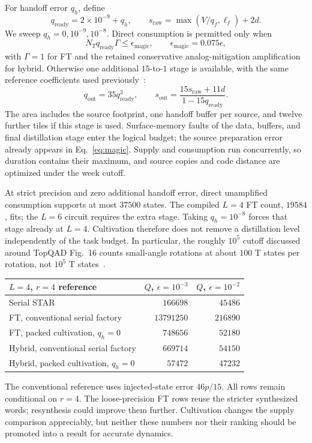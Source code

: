 \documentclass[11pt]{article}
\newcommand{\eps}{\epsilon}
\begin{document}
For handoff error $q_h$, define
\begin{equation}
 q_{\mathrm{ready}}=2\times10^{-9}+q_h,\qquad
 s_{\mathrm{raw}}=\max(V/q_f,\ell_f)+2d.
\end{equation}
We sweep $q_h=0,10^{-9},10^{-8}$. Direct consumption is permitted only when
\begin{equation}\label{eq:magic}
 N_T q_{\mathrm{ready}}\Gamma\leq\eps_{\mathrm{magic}},
 \qquad \eps_{\mathrm{magic}}=0.075\eps,
\end{equation}
with $\Gamma=1$ for FT and the retained conservative analog-mitigation
amplification for hybrid. Otherwise one additional $15$-to-$1$ stage is
available, with the same reference coefficients used previously~\cite{litinski}:
\begin{equation}
 q_{\mathrm{out}}=35q_{\mathrm{ready}}^3,\qquad
 s_{\mathrm{out}}=\frac{15s_{\mathrm{raw}}+11d}{1-15q_{\mathrm{ready}}}.
\end{equation}
The area includes the source footprint, one handoff buffer per source,
and twelve further tiles if this stage is used. Surface-memory faults of
the data, buffers, and final distillation stage enter the logical budget;
the source preparation error already appears in Eq.~\eqref{eq:magic}.
Supply and consumption run concurrently, so duration contains their maximum,
and source copies and code distance are optimized under the week cutoff.

At strict precision and zero additional handoff error, direct unamplified
consumption supports at most $37500$ states. The compiled $L=4$ FT count,
$19584$, fits; the $L=6$ circuit requires the extra stage. Taking
$q_h=10^{-8}$ forces that stage already at $L=4$. Cultivation therefore does
not remove a distillation level independently of the task budget. In
particular, the roughly $10^5$ cutoff discussed around TopQAD Fig.~16
counts small-angle rotations at about $100$ T states per rotation, not
$10^5$ T states~\cite{chung}.

\begin{center}
\begin{tabular}{lrr}
\toprule
$L=4$, $r=4$ reference & $Q$, $\eps=10^{-3}$ & $Q$, $\eps=10^{-2}$\\
\midrule
Serial STAR & $166698$ & $45486$\\
FT, conventional serial factory & $13791250$ & $216890$\\
FT, packed cultivation, $q_h=0$ & $748656$ & $52180$\\
Hybrid, conventional serial factory & $669714$ & $54150$\\
Hybrid, packed cultivation, $q_h=0$ & $57472$ & $47232$\\
\bottomrule
\end{tabular}
\end{center}
The conventional reference uses injected-state error $46p/15$. All rows
remain conditional on $r=4$. The loose-precision FT rows reuse the stricter
synthesized words; resynthesis could improve them further. Cultivation
changes the supply comparison appreciably, but neither these numbers nor
their ranking should be promoted into a result for accurate dynamics.
\end{document}
